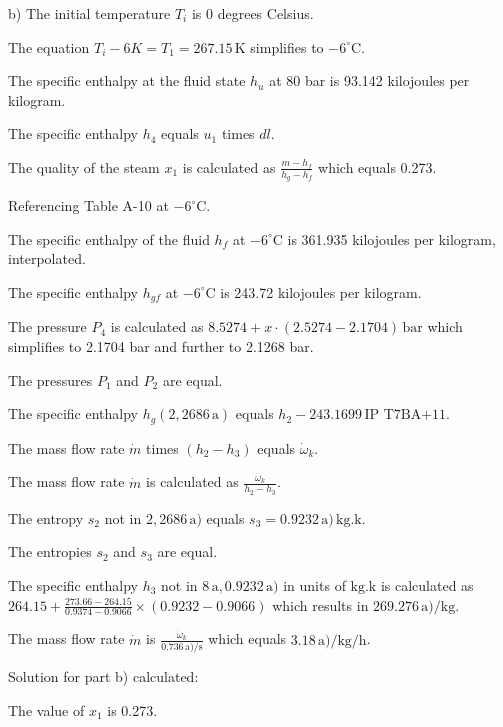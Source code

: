 b) The initial temperature \( T_i \) is 0 degrees Celsius.

The equation \( T_i - 6K = T_1 = 267.15 \, \text{K} \) simplifies to \(-6^\circ \text{C}\).

The specific enthalpy at the fluid state \( h_u \) at 80 bar is 93.142 kilojoules per kilogram.

The specific enthalpy \( h_4 \) equals \( u_1 \) times \( dl \).

The quality of the steam \( x_1 \) is calculated as \( \frac{m - h_f}{h_g - h_f} \) which equals 0.273.

Referencing Table A-10 at \(-6^\circ \text{C}\).

The specific enthalpy of the fluid \( h_f \) at \(-6^\circ \text{C}\) is 361.935 kilojoules per kilogram, interpolated.

The specific enthalpy \( h_{gf} \) at \(-6^\circ \text{C}\) is 243.72 kilojoules per kilogram.

The pressure \( P_4 \) is calculated as \( 8.5274 + x \cdot (2.5274 - 2.1704) \, \text{bar} \) which simplifies to 2.1704 bar and further to 2.1268 bar.

The pressures \( P_1 \) and \( P_2 \) are equal.

The specific enthalpy \( h_g(2,2686 \, \text{a}) \) equals \( h_2 - 243.1699 \, \text{IP T7BA+11} \).

The mass flow rate \( \dot{m} \) times \( (h_2 - h_3) \) equals \( \dot{\omega}_k \).

The mass flow rate \( \dot{m} \) is calculated as \( \frac{\dot{\omega}_k}{h_2 - h_3} \).

The entropy \( s_2 \) not in \( 2,2686 \, \text{a}) \) equals \( s_3 = 0.9232 \, \text{a}) \, \text{kg.k} \).

The entropies \( s_2 \) and \( s_3 \) are equal.

The specific enthalpy \( h_3 \) not in \( 8 \, \text{a}, 0.9232 \, \text{a}) \) in units of \( \text{kg.k} \) is calculated as \( 264.15 + \frac{273.66 - 264.15}{0.9374 - 0.9066} \times (0.9232 - 0.9066) \) which results in \( 269.276 \, \text{a})/\text{kg} \).

The mass flow rate \( \dot{m} \) is \( \frac{\dot{\omega}_k}{0.736 \, \text{a})/\text{s}} \) which equals \( 3.18 \, \text{a})/\text{kg/h} \).

Solution for part b) calculated:

The value of \( x_1 \) is 0.273.